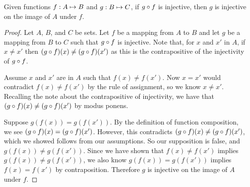 \documentclass[main.tex]{subfiles}
\begin{document}
\begin{thm}
	Given functions \({f}: {A} \mapsto{} {B}\) and \({g}: {B} \mapsto{} {C}\), if
	\({g} \circ{} {f}\) is injective, then \(g\) is injective on the image of
	\(A\) under \(f\).
\end{thm}
\begin{proof}
	Let \(A\), \(B\), and \(C\) be sets. Let \(f\) be a mapping from \(A\)
	to \(B\) and let \(g\) be a mapping from \(B\) to \(C\) such that
	\({g} \circ{} {f}\) is injective. Note that, for \(x\) and \(x'\) in
	\(A\), if \(x \neq x'\) then
	\(({g} \circ{} {f})(x) \neq ({g} \circ{} {f})(x')\) as this is the
	contrapositive of the injectivity of \({g} \circ{} {f}\).

	Assume \(x\) and \(x'\) are in \(A\) such that \(f(x) \neq f(x')\). Now
	\(x = x'\) would contradict \(f(x) \neq f(x')\) by the rule of
	assignment, so we know \(x \neq x'\). Recalling the note about the
	contrapositive of injectivity, we have that
	\(({g} \circ{} {f})(x) \neq ({g} \circ{} {f})(x')\) by modus ponens.

	Suppose \(g(f(x)) = g(f(x'))\). By the definition of function
	composition, we see \(({g} \circ{} {f})(x) = ({g} \circ{} {f})(x')\).
	However, this contradicts
	\(({g} \circ{} {f})(x) \neq ({g} \circ{} {f})(x')\), which we showed
	follows from our assumptions. So our supposition is false, and
	\(g(f(x)) \neq g(f(x'))\). Since we have shown that \(f(x) \neq f(x')\)
	implies \(g(f(x)) \neq g(f(x'))\), we also know \(g(f(x)) = g(f(x'))\)
	implies \(f(x) = f(x')\) by contraposition. Therefore \(g\) is
	injective on the image of \(A\) under \(f\).
\end{proof}
\end{document}
